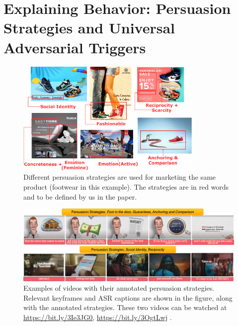 \chapter{Explaining Behavior: Persuasion Strategies and Universal Adversarial Triggers}
\label{chatper:Explaining Behavior: Persuasion Strategies}


\begin{figure}[t]
    \centering
    \includegraphics[width=0.8\textwidth]{images/footwear-strategies.pdf}
    \caption{Different persuasion strategies are used for marketing the same product (footwear in this example). The strategies are in red words and to be defined by us in the paper.}
    \label{fig:footwear-strategies}
\end{figure}


\begin{figure}[!ht]
    \centering
    \includegraphics[width=\textwidth]{images/persuasion-strategies-videos.png}
    \caption{Examples of videos with their annotated persuasion strategies. Relevant keyframes and ASR captions are shown in the figure, along with the annotated strategies. These two videos can be watched at 
    \url{https://bit.ly/3Ie3JG0}, \url{https://bit.ly/3OgtLwj}
    .}
    \label{fig:persuasion-strategy-dataset-examples}
\end{figure}



